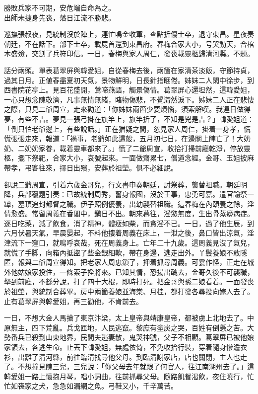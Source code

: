 \begin{myquote}
勝敗兵家不可期，安危端自命為之。\\出師未捷身先䘮，落日江流不勝悲。
\end{myquote}

巡撫張叔夜，見統制沒於陣上，連忙鳴金收軍，查點折傷士卒，退守東昌。星夜奏朝廷，不在話下。部下士卒，載屍首還到東昌府。春梅合家大小，号哭動天，合棺木盛殮，交割了兵符印信。一日，春梅與家人周仁，發䘮載靈柩歸清河縣。不題。

話分兩頭。單表葛翠屏與韓愛姐，自從春梅去後，兩箇在家清茶淡飯，守節持貞，過其日月。正値春盡夏初天氣，景物鮮明，日長針指睏倦。姊妹二人閑中徐步，到西書院花亭上。見百花盛開，鶯啼燕語，觸景傷情。葛翠屏心還坦然，這韓愛姐，一心只想念陳敬濟，凡事無情無緒，睹物傷悲，不覺潸然淚下。{}姊妹二人正在悲悽之際，只見二爺周宣，走來勸道：「你姊妹兩箇少要煩惱，須索解嘆。我連日做得夢，有些不吉。夢見一張弓掛在旗竿上，旗竿折了，不知是兇是吉？」韓愛姐道：「倒只怕老爺邊上，有些說話。」正在猶疑之間，忽見家人周仁，掛着一身孝，慌慌張張走來，報道：「禍事，老爺如此這般，五月初七日，在邊關上陣亡了！大奶奶、二奶奶家眷，載着靈車都來了。」慌了二爺周宣，收拾打掃前廳乾淨，停放靈柩，擺下祭祀，合家大小，哀號起來。一面做齋累七，僧道念經。金哥、玉姐披麻帶孝，弔客往來，擇日出殯，安葬於祖塋。俱不必細說。

卻說二爺周宣，引着六歲金哥兒，行文書申奏朝廷，討祭葬，襲替祖職。朝廷明降，兵部覆題引奏：已故統制周秀，奮身報國，沒於王事，忠勇可嘉。遣官諭祭一罈，墓頂追封都督之職。伊子照例優養，出幼襲替祖職。這春梅在內頤養之餘，淫情愈盛。常留周義在香閣中，鎭日不出。朝來暮往，淫慾無度，生出骨蒸癆病症。逐日吃藥，減了飲食，消了精神，體瘦如柴，而貪淫不已。一日，過了他生辰，到六月伏暑天氣，早晨晏起，不料他摟着周義在床上，一泄之後，{}鼻口皆出涼氣，淫津流下一窪口，就鳴呼哀哉，死在周義身上。亡年二十九歲。{}這周義見沒了氣兒，就慌了手脚，向箱內抵盜了些金銀細軟，帶在身邊，逃走出外。丫鬟養娘不敢隱匿，報與二爺周宣得知。把老家人周忠鎖了，押着抓尋周義。可霎作怪，正走在城外他姑娘家投住，一條索子拴將來。已知其情，恐揚出醜去，金哥久後不可襲職，拏到前廳，不繇分說，打了四十大棍，即時打死。{}把金哥與孫二娘看着。一面發䘮於祖塋，與統制合葬畢。房中兩箇養娘並海棠、月桂，都打發各尋投向嫁人去了。止有葛翠屏與韓愛姐，再三勸他，不肯前去。

一日，不想大金人馬搶了東京汴梁，太上皇帝與靖康皇帝，都被虜上北地去了。中原無主，四下荒亂。兵戈匝地，人民逃竄。黎庶有塗炭之哭，百姓有倒懸之苦。大勢番兵已殺到山東地界，民間夫逃妻散，鬼哭神號，父子不相顧。葛翠屏已被他娘家領去，各逃生命。止丟下韓愛姐，無處依倚，不免收拾行裝，穿着隨身慘澹衣衫，出離了清河縣，前往臨清找尋他父母。到臨清謝家店，店也關閉，主人也走了。不想撞見陳三兒，三兒說：「你父母去年就跟了何官人，往江南湖州去了。」這韓愛姐一路上懷抱月琴，唱小詞曲，往前抓尋父母。隨路飢餐渴飲，夜住曉行，忙忙如䘮家之犬，急急如漏網之魚。弓鞋又小，千辛萬苦。

